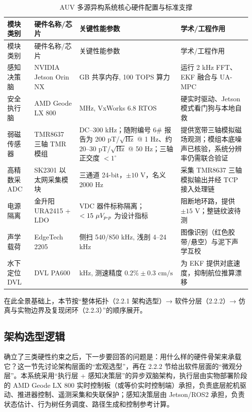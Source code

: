 \begin{longtable}[]{@{}
  >{\raggedright\arraybackslash}p{}
  >{\raggedright\arraybackslash}p{}
  >{\raggedright\arraybackslash}p{}
  >{\raggedright\arraybackslash}p{}@{}}
\caption{AUV 多源异构系统核心硬件配置与标准支撑}\label{tab:ch02-hardware}\tabularnewline
\toprule\noalign{}
模块类别 & 硬件名称/芯片 & 关键性能参数 & 学术/工程作用 \\
\midrule\noalign{}
\endfirsthead
\toprule\noalign{}
模块类别 & 硬件名称/芯片 & 关键性能参数 & 学术/工程作用 \\
\midrule\noalign{}
\endhead
\bottomrule\noalign{}
\endlastfoot
感知决策脑 & NVIDIA Jetson Orin NX & 16 GB 共享内存, 100 TOPS 算力 & 运行 2 kHz FFT、EKF 融合与 UA-MPC \\
安全执行脑 & AMD Geode LX 800 & 500 MHz, VxWorks 6.8 RTOS & 硬实时驱动、Jetson 模式看门狗与本地自救 \\
弱磁传感器 & TMR8637 三轴 TMR 模组 & DC--300 kHz；随附编号 6\# 报告为 200 pT/\(\sqrt{\text{Hz}}\) @ 1 Hz、约 20--30 pT/\(\sqrt{\text{Hz}}\) @ 50 Hz；三轴正交度 \(<1^\circ\) & 提供宽带三轴模拟磁场观测；模组本底噪声已核验，系统分辨率仍需联合验证 \\
高精数采 ADC & SK2301 以太网采集模块 & 三通道 24-bit，\(\pm10\text{ V}\)，名义 2000 Hz & 采集 TMR8637 三轴模拟输出并经 TCP 接入处理链 \\
电源隔离 & 金升阳 URA2415 + LDO & 1500 VDC 器件标称隔离；\(<15\ \mu V_{p\text-p}\) 为设计指标 & 阻断地环路，提供 \(\pm15\text{ V}\)；整链纹波待测 \\
声学载荷 & EdgeTech 2205 & 侧扫 540/850 kHz, 浅剖 4--24 kHz & 图像识别（红色胶带/悬空）与泥下声学互校 \\
水下定位 DVL & DVL PA600 & 600 kHz, 测速精度 \(0.2\%\pm0.3\text{ cm/s}\) & 为 EKF 提供对底速度，抑制航位推算漂移 \\
\end{longtable}

在此全景基础上，本节按``整体拓扑（2.2.1 架构选型）→ 软件分层（2.2.2）→ 仿真与实物边界及复现闭环（2.2.3）''的顺序展开。

\subsection{架构选型逻辑}\label{sec:ch02-2-2-1}

确立了三类硬性约束之后，下一步要回答的问题是：用什么样的硬件骨架来承载它？这一节先讨论架构层面的``宏观选型''，再在 2.2.2 节给出软件层面的``微观分层''。本系统采用``执行层 + 感知决策层''的异步双脑架构，执行层由实物部署阶段的 AMD Geode LX 800 实时控制板（或等价实时控制端）承担，负责底层舵机驱动、推进器控制、遥测采集和失联保护；感知决策层由 Jetson/ROS2 承担，负责状态估计、行为树任务调度、路径生成和控制参考计算。

